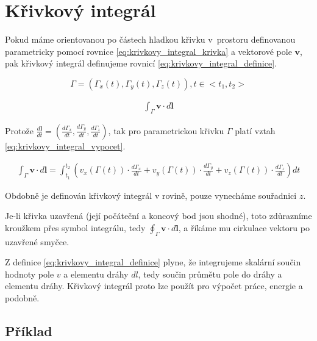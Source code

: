 \documentclass{book}
\newcommand{\vect}[1]{\boldsymbol{#1}}
\begin{document}
\section{Křivkový integrál}

Pokud máme orientovanou po částech hladkou křivku v~prostoru definovanou parametricky pomocí rovnice \eqref{eq:krivkovy_integral_krivka} a vektorové pole \(\vect{v}\), pak křivkový integrál definujeme rovnicí \eqref{eq:krivkovy_integral_definice}.

\begin{equation}
\label{eq:krivkovy_integral_krivka}
\Gamma = (\Gamma_x(t), \Gamma_y(t), \Gamma_z(t)), t \in <t_1, t_2>
\end{equation}

\begin{equation}
\label{eq:krivkovy_integral_definice}
\begin{split}
\int_\Gamma \vect{v} \cdot d\vect{l}
\end{split}
\end{equation}

Protože \(\frac{d\vect{l}}{dt} = \left(\frac{d \Gamma_x}{dt}, \frac{d \Gamma_y}{dt}, \frac{d \Gamma_z}{dt} \right)\), tak pro parametrickou křivku
\(\Gamma\) platí vztah \eqref{eq:krivkovy_integral_vypocet}.

\begin{equation}
\label{eq:krivkovy_integral_vypocet}
\begin{split}
\int_\Gamma \vect{v} \cdot d\vect{l} =
\int_{t_1}^{t_2} \left(v_x(\Gamma(t)) \cdot \frac{d \Gamma_x}{dt} + v_y(\Gamma(t)) \cdot \frac{d \Gamma_y}{dt} + v_z(\Gamma(t)) \cdot \frac{d \Gamma_z}{dt} \right) dt
\end{split}
\end{equation}

Obdobně je definován křivkový integrál v rovině, pouze vynecháme souřadnici \(z\).

Je-li křivka uzavřená (její počáteční a koncový bod jsou shodné), toto zdůrazníme kroužkem přes symbol integrálu, tedy \(\oint_\Gamma \vect{v} \cdot d\vect{l}\), a říkáme mu cirkulace vektoru po uzavřené smyčce.

Z definice \eqref{eq:krivkovy_integral_definice} plyne, že integrujeme skalární součin hodnoty pole \(v\) a elementu dráhy \(dl\),
tedy součin průmětu pole do dráhy a elementu dráhy. Křivkový integrál proto lze použít pro výpočet práce, energie a podobně.


\subsection{Příklad}
\end{document}
